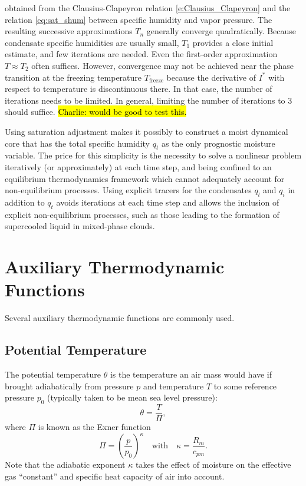 \documentclass{report}
\begin{document}
obtained from the Clausius-Clapeyron relation \eqref{e:Clausius_Clapeyron} and the relation \eqref{eq:sat_shum} between specific humidity and vapor pressure. The resulting successive approximations $T_n$ generally converge quadratically. Because condensate specific humidities are usually small, $T_1$ provides a close initial estimate, and few iterations are needed. Even the first-order approximation $T\approx T_2$ often suffices. However, convergence may not be achieved near the phase transition at the freezing temperature $T_{\mathrm{freeze}}$ because the derivative of $I^*$ with respect to temperature is discontinuous there. In that case, the number of iterations needs to be limited. In general, limiting the number of iterations to 3 should suffice. \hl{Charlie: would be good to test this.}

Using saturation adjustment makes it possibly to construct a moist dynamical core that has the total specific humidity $q_t$ as the only prognostic moisture variable. The price for this simplicity is the necessity to solve a nonlinear problem iteratively (or approximately) at each time step, and being confined to an equilibrium thermodynamics framework which cannot adequately account for non-equilibrium processes. Using explicit tracers for the condensates $q_l$ and $q_i$ in addition to $q_t$ avoids iterations at each time step and allows the inclusion of explicit non-equilibrium processes, such as those leading to the formation of supercooled liquid in mixed-phase clouds. 

\section{Auxiliary Thermodynamic Functions}

Several auxiliary thermodynamic functions are commonly used. 

\subsection{Potential Temperature} The potential temperature $\theta$ is the temperature an air mass would have if brought adiabatically from pressure $p$ and temperature $T$ to some reference pressure $p_0$ (typically taken to be mean sea level pressure):
\begin{equation}\label{e:pot_temp_press_T}
\theta = \frac{T}{\Pi},  
\end{equation}
where $\Pi$ is known as the Exner function
\begin{equation}
    \Pi  = \left( \frac{p}{p_0} \right)^\kappa \quad \text{with} \quad \kappa = \frac{R_m}{c_{pm}}.
\end{equation}
Note that the adiabatic exponent $\kappa$ takes the effect of  moisture on the effective gas ``constant'' and specific heat capacity of air into account.
\end{document}

